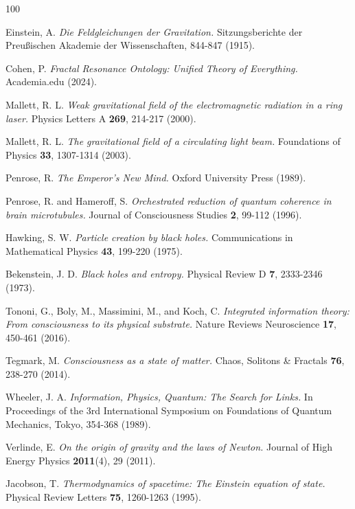 \documentclass[11pt]{article}
\theoremstyle{definition}
\begin{document}

\newpage
\begin{thebibliography}{100}

Einstein, A.
\textit{Die Feldgleichungen der Gravitation.}
Sitzungsberichte der Preußischen Akademie der Wissenschaften, 844-847 (1915).

Cohen, P.
\textit{Fractal Resonance Ontology: Unified Theory of Everything.}
Academia.edu (2024).

Mallett, R. L.
\textit{Weak gravitational field of the electromagnetic radiation in a ring laser.}
Physics Letters A \textbf{269}, 214-217 (2000).

Mallett, R. L.
\textit{The gravitational field of a circulating light beam.}
Foundations of Physics \textbf{33}, 1307-1314 (2003).

Penrose, R.
\textit{The Emperor's New Mind.}
Oxford University Press (1989).

Penrose, R. and Hameroff, S.
\textit{Orchestrated reduction of quantum coherence in brain microtubules.}
Journal of Consciousness Studies \textbf{2}, 99-112 (1996).

Hawking, S. W.
\textit{Particle creation by black holes.}
Communications in Mathematical Physics \textbf{43}, 199-220 (1975).

Bekenstein, J. D.
\textit{Black holes and entropy.}
Physical Review D \textbf{7}, 2333-2346 (1973).

Tononi, G., Boly, M., Massimini, M., and Koch, C.
\textit{Integrated information theory: From consciousness to its physical substrate.}
Nature Reviews Neuroscience \textbf{17}, 450-461 (2016).

Tegmark, M.
\textit{Consciousness as a state of matter.}
Chaos, Solitons \& Fractals \textbf{76}, 238-270 (2014).

Wheeler, J. A.
\textit{Information, Physics, Quantum: The Search for Links.}
In Proceedings of the 3rd International Symposium on Foundations of Quantum Mechanics, Tokyo, 354-368 (1989).

Verlinde, E.
\textit{On the origin of gravity and the laws of Newton.}
Journal of High Energy Physics \textbf{2011}(4), 29 (2011).

Jacobson, T.
\textit{Thermodynamics of spacetime: The Einstein equation of state.}
Physical Review Letters \textbf{75}, 1260-1263 (1995).


\end{thebibliography}
\end{document}
